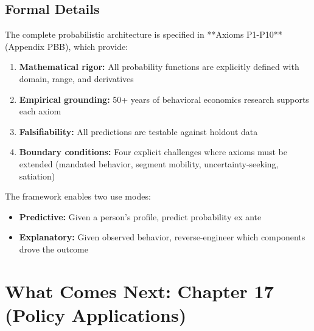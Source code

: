 \subsection{Formal Details}

The complete probabilistic architecture is specified in **Axioms P1-P10** (Appendix PBB), which provide:
\begin{enumerate}[nosep]
    \item \textbf{Mathematical rigor:} All probability functions are explicitly defined with domain, range, and derivatives
    \item \textbf{Empirical grounding:} 50+ years of behavioral economics research supports each axiom
    \item \textbf{Falsifiability:} All predictions are testable against holdout data
    \item \textbf{Boundary conditions:} Four explicit challenges where axioms must be extended (mandated behavior, segment mobility, uncertainty-seeking, satiation)
\end{enumerate}

The framework enables two use modes:
\begin{itemize}[nosep]
    \item \textbf{Predictive:} Given a person's profile, predict probability ex ante
    \item \textbf{Explanatory:} Given observed behavior, reverse-engineer which components drove the outcome
\end{itemize}

\section{What Comes Next: Chapter 17 (Policy Applications)}

